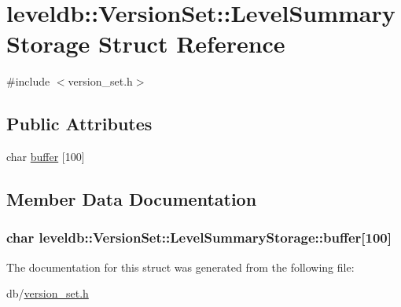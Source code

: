 \hypertarget{structleveldb_1_1_version_set_1_1_level_summary_storage}{\section{leveldb\-:\-:Version\-Set\-:\-:Level\-Summary\-Storage Struct Reference}
\label{structleveldb_1_1_version_set_1_1_level_summary_storage}
}


{\ttfamily \#include $<$version\-\_\-set.\-h$>$}

\subsection*{Public Attributes}
\begin{DoxyCompactItemize}
\item 
char \hyperlink{structleveldb_1_1_version_set_1_1_level_summary_storage_a90b283461affa0f25f41bc21a9c81bbc}{buffer} \mbox{[}100\mbox{]}
\end{DoxyCompactItemize}


\subsection{Member Data Documentation}
\hypertarget{structleveldb_1_1_version_set_1_1_level_summary_storage_a90b283461affa0f25f41bc21a9c81bbc}{
\subsubsection[{buffer}]{\setlength{\rightskip}{0pt plus 5cm}char leveldb\-::\-Version\-Set\-::\-Level\-Summary\-Storage\-::buffer\mbox{[}100\mbox{]}}}\label{structleveldb_1_1_version_set_1_1_level_summary_storage_a90b283461affa0f25f41bc21a9c81bbc}


The documentation for this struct was generated from the following file\-:\begin{DoxyCompactItemize}
\item 
db/\hyperlink{version__set_8h}{version\-\_\-set.\-h}\end{DoxyCompactItemize}
